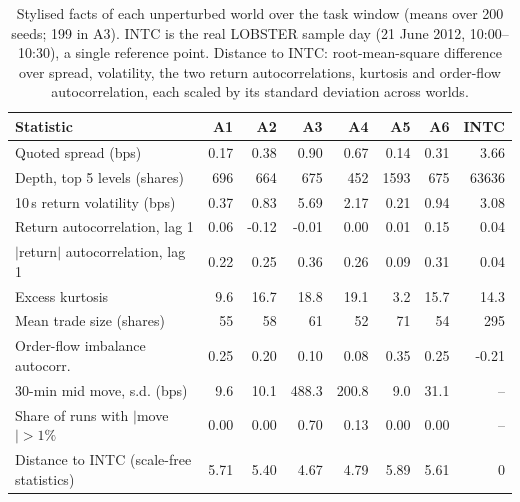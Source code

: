\begin{table}[!htbp]
\centering\footnotesize
\caption{Stylised facts of each unperturbed world over the task window (means over 200 seeds; 199 in A3). INTC is the real LOBSTER sample day (21 June 2012, 10:00--10:30), a single reference point. Distance to INTC: root-mean-square difference over spread, volatility, the two return autocorrelations, kurtosis and order-flow autocorrelation, each scaled by its standard deviation across worlds.}\label{tab:obs}
\begin{tabular}{lrrrrrrr}
\toprule
Statistic & A1 & A2 & A3 & A4 & A5 & A6 & INTC \\
\midrule
Quoted spread (bps) & 0.17 & 0.38 & 0.90 & 0.67 & 0.14 & 0.31 & 3.66 \\
Depth, top 5 levels (shares) & 696 & 664 & 675 & 452 & 1593 & 675 & 63636 \\
10\,s return volatility (bps) & 0.37 & 0.83 & 5.69 & 2.17 & 0.21 & 0.94 & 3.08 \\
Return autocorrelation, lag 1 & 0.06 & -0.12 & -0.01 & 0.00 & 0.01 & 0.15 & 0.04 \\
$|$return$|$ autocorrelation, lag 1 & 0.22 & 0.25 & 0.36 & 0.26 & 0.09 & 0.31 & 0.04 \\
Excess kurtosis & 9.6 & 16.7 & 18.8 & 19.1 & 3.2 & 15.7 & 14.3 \\
Mean trade size (shares) & 55 & 58 & 61 & 52 & 71 & 54 & 295 \\
Order-flow imbalance autocorr. & 0.25 & 0.20 & 0.10 & 0.08 & 0.35 & 0.25 & -0.21 \\
30-min mid move, s.d. (bps) & 9.6 & 10.1 & 488.3 & 200.8 & 9.0 & 31.1 & -- \\
Share of runs with $|$move$|>1\%$ & 0.00 & 0.00 & 0.70 & 0.13 & 0.00 & 0.00 & -- \\
\midrule
Distance to INTC (scale-free statistics) & 5.71 & 5.40 & 4.67 & 4.79 & 5.89 & 5.61 & 0 \\
\bottomrule
\end{tabular}
\end{table}
